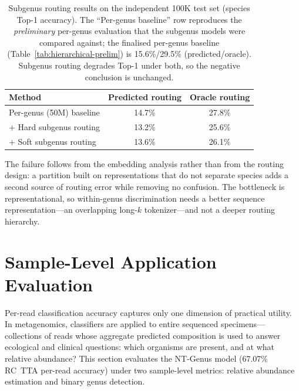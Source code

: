 \begin{table}[htbp]
    \centering
    \caption{Subgenus routing results on the independent 100K test set (species Top-1 accuracy).
    The ``Per-genus baseline'' row reproduces the \emph{preliminary} per-genus evaluation that the subgenus models were compared against; the finalised per-genus baseline (Table~\ref{tab:hierarchical-prelim}) is 15.6\%/29.5\% (predicted/oracle). Subgenus routing degrades Top-1 under both, so the negative conclusion is unchanged.}
    \label{tab:subgenus-routing}
    \small
    \setlength{\tabcolsep}{5pt}
    \begin{tabular}{lcc}
        \toprule
        \textbf{Method} & \textbf{Predicted routing} & \textbf{Oracle routing} \\
        \midrule
        Per-genus (50M) baseline     & 14.7\%  & 27.8\% \\
        + Hard subgenus routing      & 13.2\%  & 25.6\% \\
        + Soft subgenus routing      & 13.6\%  & 26.1\% \\
        \bottomrule
    \end{tabular}
\end{table}

The failure follows from the embedding analysis rather than from the routing design:
a partition built on representations that do not separate species adds a second
source of routing error while removing no confusion. The bottleneck is
representational, so within-genus discrimination needs a better sequence
representation---an overlapping long-$k$ tokenizer---and not a deeper routing
hierarchy.

\section{Sample-Level Application Evaluation}
\label{sec:exp-sample}

Per-read classification accuracy captures only one dimension of practical utility.
In metagenomics, classifiers are applied to entire sequenced specimens---collections of reads whose aggregate predicted composition is used to answer ecological and clinical questions: which organisms are present, and at what relative abundance?
This section evaluates the NT-Genus model (67.07\% RC~TTA per-read accuracy) under two sample-level metrics: relative abundance estimation and binary genus detection.

